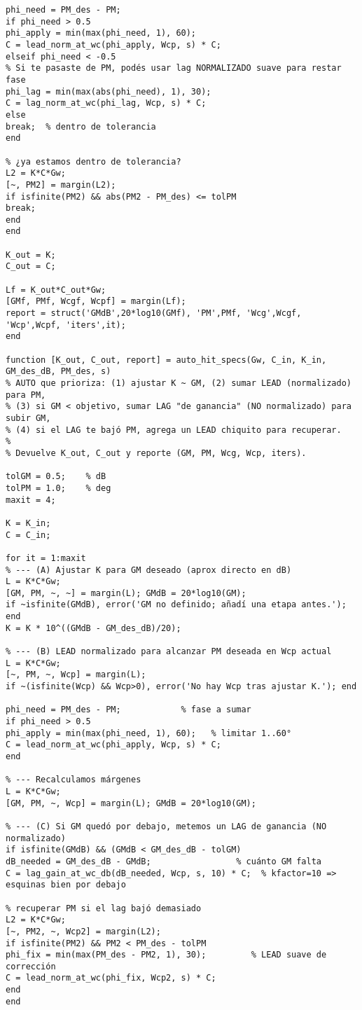 \begin{lstlisting}[style=matlabstyle,caption={Funciones creadas para este laboratorio.},label={matlab:newfunc}]
phi_need = PM_des - PM;
if phi_need > 0.5
phi_apply = min(max(phi_need, 1), 60);
C = lead_norm_at_wc(phi_apply, Wcp, s) * C;
elseif phi_need < -0.5
% Si te pasaste de PM, podés usar lag NORMALIZADO suave para restar fase
phi_lag = min(max(abs(phi_need), 1), 30);
C = lag_norm_at_wc(phi_lag, Wcp, s) * C;
else
break;  % dentro de tolerancia
end

% ¿ya estamos dentro de tolerancia?
L2 = K*C*Gw;
[~, PM2] = margin(L2);
if isfinite(PM2) && abs(PM2 - PM_des) <= tolPM
break;
end
end

K_out = K;
C_out = C;

Lf = K_out*C_out*Gw;
[GMf, PMf, Wcgf, Wcpf] = margin(Lf);
report = struct('GMdB',20*log10(GMf), 'PM',PMf, 'Wcg',Wcgf, 'Wcp',Wcpf, 'iters',it);
end

function [K_out, C_out, report] = auto_hit_specs(Gw, C_in, K_in, GM_des_dB, PM_des, s)
% AUTO que prioriza: (1) ajustar K ~ GM, (2) sumar LEAD (normalizado) para PM,
% (3) si GM < objetivo, sumar LAG "de ganancia" (NO normalizado) para subir GM,
% (4) si el LAG te bajó PM, agrega un LEAD chiquito para recuperar.
%
% Devuelve K_out, C_out y reporte (GM, PM, Wcg, Wcp, iters).

tolGM = 0.5;    % dB
tolPM = 1.0;    % deg
maxit = 4;

K = K_in;
C = C_in;

for it = 1:maxit
% --- (A) Ajustar K para GM deseado (aprox directo en dB)
L = K*C*Gw;
[GM, PM, ~, ~] = margin(L); GMdB = 20*log10(GM);
if ~isfinite(GMdB), error('GM no definido; añadí una etapa antes.'); end
K = K * 10^((GMdB - GM_des_dB)/20);

% --- (B) LEAD normalizado para alcanzar PM deseada en Wcp actual
L = K*C*Gw;
[~, PM, ~, Wcp] = margin(L);
if ~(isfinite(Wcp) && Wcp>0), error('No hay Wcp tras ajustar K.'); end

phi_need = PM_des - PM;            % fase a sumar
if phi_need > 0.5
phi_apply = min(max(phi_need, 1), 60);   % limitar 1..60°
C = lead_norm_at_wc(phi_apply, Wcp, s) * C;
end

% --- Recalculamos márgenes
L = K*C*Gw;
[GM, PM, ~, Wcp] = margin(L); GMdB = 20*log10(GM);

% --- (C) Si GM quedó por debajo, metemos un LAG de ganancia (NO normalizado)
if isfinite(GMdB) && (GMdB < GM_des_dB - tolGM)
dB_needed = GM_des_dB - GMdB;                 % cuánto GM falta
C = lag_gain_at_wc_db(dB_needed, Wcp, s, 10) * C;  % kfactor=10 => esquinas bien por debajo

% recuperar PM si el lag bajó demasiado
L2 = K*C*Gw;
[~, PM2, ~, Wcp2] = margin(L2);
if isfinite(PM2) && PM2 < PM_des - tolPM
phi_fix = min(max(PM_des - PM2, 1), 30);         % LEAD suave de corrección
C = lead_norm_at_wc(phi_fix, Wcp2, s) * C;
end
end


\end{lstlisting}
